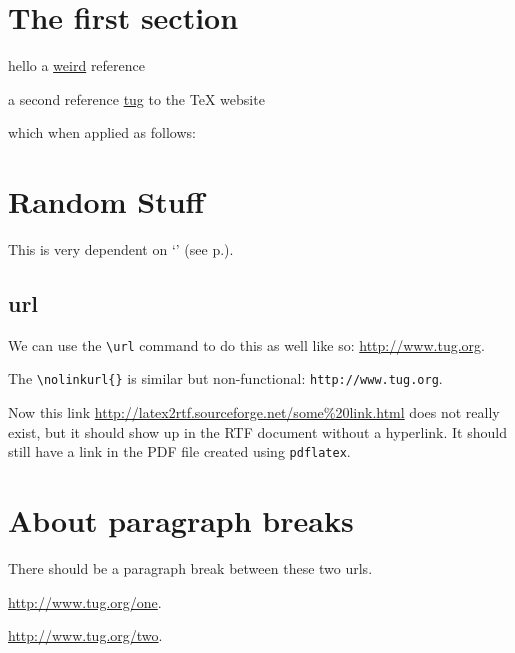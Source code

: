 \documentclass{article}
\newif\iflatextortf
\begin{document}
\newcommand{\myref}[1]{`\nameref{#1}' (see p.\pageref{#1})}

\iflatextortf
\newcommand{\myurl}[1]{\nolinkurl{#1}}
\let\letequalurl=\nolinkurl
\let\leturl\nolinkurl
\else
\let\myurl\url
\let\letequalurl=\url
\let\leturl\url
\fi

\section{The first section}
hello a 
\href{http://www-fourier.ujf-grenoble.fr:80/cgi-bin/zbfr/ZB/math-fr.html?AU=Taylor,+R&format=complete&type=html&maxdocs=10}{weird}
reference

a second reference 
\href{http://www.tug.org/}{tug}
to the \TeX{} website 

which when applied as follows:

\section{Random Stuff}\label{randomlabel}
This is very dependent on \myref{randomlabel}.


\subsection{url}
We can use the \verb#\url# command to do this as
well like so: \url{http://www.tug.org}.  

The \verb#\nolinkurl{}# is similar but non-functional: \nolinkurl{http://www.tug.org}. 

Now this link \myurl{http://latex2rtf.sourceforge.net/some%
exist, but it should show up in the RTF document without a hyperlink.  It should still
have a link in the PDF file created using \texttt{pdflatex}.

\section{About paragraph breaks}

There should be a paragraph break between these two urls.

\url{http://www.tug.org/one}. 

\url{http://www.tug.org/two}. 

\end{document}
